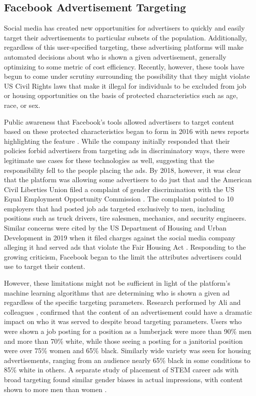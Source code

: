 \documentclass[]{krantz}
\begin{document}
\subsection{Facebook Advertisement
Targeting}\label{facebook-advertisement-targeting}

Social media has created new opportunities for advertisers to quickly
and easily target their advertisements to particular subsets of the
population. Additionally, regardless of this user-specified targeting,
these advertising platforms will make automated decisions about who is
shown a given advertisement, generally optimizing to some metric of cost
efficiency. Recently, however, these tools have begun to come under
scrutiny surrounding the possibility that they might violate US Civil
Rights laws that make it illegal for individuals to be excluded from job
or housing opportunities on the basis of protected characteristics such
as age, race, or sex.

Public awareness that Facebook's tools allowed advertisers to target
content based on these protected characteristics began to form in 2016
with news reports highlighting the feature \citep{angwin2016c}. While
the company initially responded that their policies forbid advertisers
from targeting ads in discriminatory ways, there were legitimate use
cases for these technologies as well, suggesting that the responsibility
fell to the people placing the ads. By 2018, however, it was clear that
the platform was allowing some advertisers to do just that and the
American Civil Liberties Union filed a complaint of gender
discrimination with the US Equal Employment Opportunity Commission
\citep{campbell2018}. The complaint pointed to 10 employers that had
posted job ads targeted exclusively to men, including positions such as
truck drivers, tire salesmen, mechanics, and security engineers. Similar
concerns were cited by the US Department of Housing and Urban
Development in 2019 when it filed charges against the social media
company alleging it had served ads that violate the Fair Housing Act
\citep{brandom2019}. Responding to the growing criticism, Facebook began
to the limit the attributes advertisers could use to target their
content.

However, these limitations might not be sufficient in light of the
platform's machine learning algorithms that are determining who is shown
a given ad regardless of the specific targeting parameters. Research
performed by Ali and colleagues \citeyearpar{ali2019}, confirmed that
the content of an advertisement could have a dramatic impact on who it
was served to despite broad targeting parameters. Users who were shown a
job posting for a position as a lumberjack were more than 90\% men and
more than 70\% white, while those seeing a posting for a janitorial
position were over 75\% women and 65\% black. Similarly wide variety was
seen for housing advertisements, ranging from an audience nearly 65\%
black in some conditions to 85\% white in others. A separate study of
placement of STEM career ads with broad targeting found similar gender
biases in actual impressions, with content shown to more men than women
\citep{lambrecht2019}.
\end{document}
